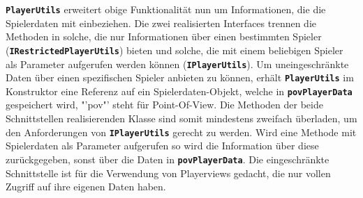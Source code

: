 \documentclass[
							a4paper, 
							11pt, 
							openany, 
							liststotoc,
							parskip=half, 
   							headings=normal
						]{scrreprt}
\begin{document}
{\textbf{\texttt{PlayerUtils}} erweitert obige Funktionalität nun um Informationen, die die Spielerdaten mit einbeziehen. Die zwei realisierten Interfaces trennen die Methoden in solche, die nur Informationen über einen bestimmten Spieler (\textbf{\texttt{IRestrictedPlayerUtils}}) bieten und solche, die mit einem beliebigen Spieler als Parameter aufgerufen werden können (\textbf{\texttt{IPlayerUtils}}).\newline
Um uneingeschränkte Daten über einen spezifischen Spieler anbieten zu können, erhält \textbf{\texttt{PlayerUtils}} im Konstruktor eine Referenz auf ein Spielerdaten-Objekt, welche in \textbf{\texttt{pov\-Player\-Data}} gespeichert wird, "'pov"' steht für Point-Of-View.\newline
Die Methoden der beide Schnittstellen realisierenden Klasse sind somit mindestens zweifach überladen, um den Anforderungen von \textbf{\texttt{IPlayerUtils}} gerecht zu werden.
Wird eine Methode mit Spielerdaten als Parameter aufgerufen so wird die Information über diese zurückgegeben, sonst über die Daten in \textbf{\texttt{povPlayerData}}. Die eingeschränkte Schnittstelle ist für die Verwendung von Playerviews gedacht, die nur vollen Zugriff auf ihre eigenen Daten haben.

}
\end{document}
